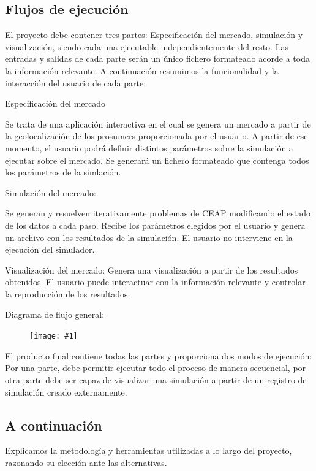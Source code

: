 \documentclass[12pt,a4paper,openright,oneside]{article}
\newcommand{\includeImage}[1]
{
	\begin{figure}[htb]
	\begin{center}
	\texttt{[image: \#1]}
	\end{center}
	\end{figure}
}
\numberwithin{equation}{section}
\theoremstyle{definition}
\begin{document}
\subsection{Flujos de ejecución}

El proyecto debe contener tres partes: Especificación del mercado, simulación y visualización, siendo cada una ejecutable independientemente del resto. Las entradas y salidas de cada parte serán un único fichero formateado acorde a toda la información relevante. A continuación resumimos la funcionalidad y la interacción del usuario de cada parte:

Especificación del mercado

Se trata de una aplicación interactiva en el cual se genera un mercado a partir de la geolocalización de los prosumers proporcionada por el usuario. A partir de ese momento, el usuario podrá definir distintos parámetros sobre la simulación a ejecutar sobre el mercado. Se generará un fichero formateado que contenga todos los parámetros de la simlación.

Simulación del mercado:

Se generan y resuelven iterativamente problemas de CEAP modificando el estado de los datos a cada paso.
Recibe los parámetros elegidos por el usuario y genera un archivo con los resultados de la simulación. El usuario no interviene en la ejecución del simulador.

Visualización del mercado:
Genera una visualización a partir de los resultados obtenidos. El usuario puede interactuar con la información relevante y controlar la reproducción de los resultados. 

Diagrama de flujo general:
\includeImage{flujos_principales.png}

El producto final contiene todas las partes y proporciona dos modos de ejecución: Por una parte, debe permitir ejecutar todo el proceso de manera secuencial, por otra parte debe ser capaz de visualizar una simulación a partir de un registro de simulación creado externamente.


\subsection{A continuación}

Explicamos la metodología y herramientas utilizadas a lo largo del proyecto, razonando su elección ante las alternativas.



\newpage
\end{document}

